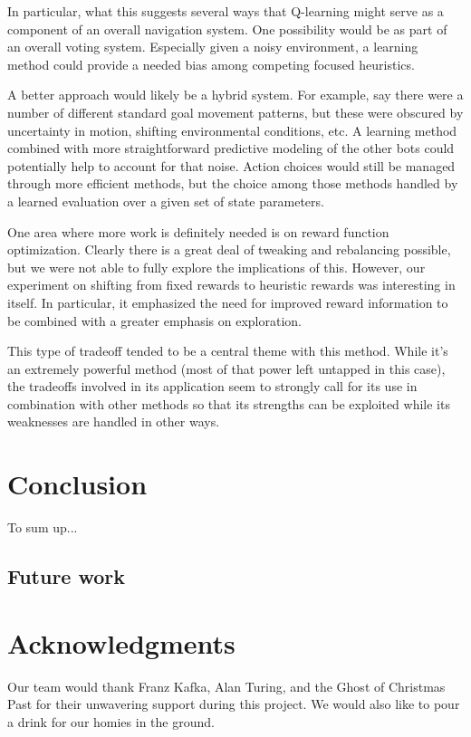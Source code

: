 \documentclass{aiaa-tc}%
\begin{document}
In particular, what this suggests several ways that Q-learning might serve as a
component of an overall navigation system. One possibility would be as
part of an overall voting system. Especially given a noisy
environment, a learning method could provide a needed bias among
competing focused heuristics.

A better approach would likely be a hybrid system. For example, say
there were a number of different standard goal movement patterns, but
these were obscured by uncertainty in motion, shifting environmental
conditions, etc. A learning method combined with more straightforward
predictive modeling of the other bots could potentially help to
account for that noise. Action choices would still be managed through
more efficient methods, but the choice among those methods handled by
a learned evaluation over a given set of state parameters.

One area where more work is definitely needed is on reward function
optimization. Clearly there is a great deal of tweaking and rebalancing
possible, but we were not able to fully explore the implications of
this. However, our experiment on shifting from fixed rewards to
heuristic rewards was interesting in itself. In particular, it
emphasized the need for improved reward information to be combined with a greater emphasis
on exploration.

This type of tradeoff tended to be a central theme with this
method. While it's an extremely powerful method (most of that power
left untapped in this case), the tradeoffs involved in its application
seem to strongly call for its use in combination with other
methods so that its strengths can be exploited while its weaknesses
are handled in other ways.

\section{Conclusion}
\label{Conclusion}
To sum up...

\subsection{Future work}

\section{Acknowledgments}
Our team would thank Franz Kafka, Alan Turing, and the Ghost of
Christmas Past for their unwavering support during this project. We
would also like to pour a drink for our homies in the ground.


% 

% 
\end{document}

